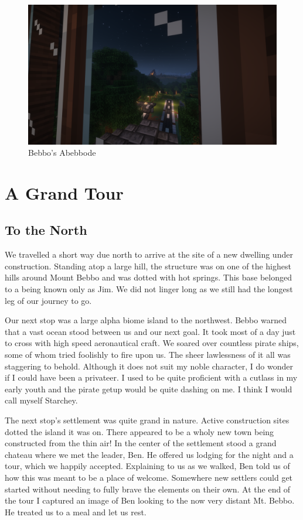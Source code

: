 \begin{figure}[H]
	\centering
	\includegraphics[width=\linewidth]{View from Bebbo's House.png}
	\caption{Bebbo's Abebbode}
\end{figure}

\chapter{A Grand Tour}

\section{To the North}

We travelled a short way due north to arrive at the site of a new dwelling under construction. Standing atop a large hill, the structure was on one of the highest hills around Mount Bebbo and was dotted with hot springs. This base belonged to a being known only as Jim. We did not linger long as we still had the longest leg of our journey to go.

Our next stop was a large alpha biome island to the northwest. Bebbo warned that a vast ocean stood between us and our next goal. It took most of a day just to cross with high speed aeronautical craft. We soared over countless pirate ships, some of whom tried foolishly to fire upon us. The sheer lawlessness of it all was staggering to behold. Although it does not suit my noble character, I do wonder if I could have been a privateer. I used to be quite proficient with a cutlass in my early youth and the pirate getup would be quite dashing on me. I think I would call myself Starchey.

The next stop's settlement was quite grand in nature. Active construction sites dotted the island it was on. There appeared to be a wholy new town being constructed from the thin air! In the center of the settlement stood a grand chateau where we met the leader, Ben. He offered us lodging for the night and a tour, which we happily accepted. Explaining to us as we walked, Ben told us of how this was meant to be a place of welcome. Somewhere new settlers could get started without needing to fully brave the elements on their own. At the end of the tour I captured an image of Ben looking to the now very distant Mt. Bebbo. He treated us to a meal and let us rest.

